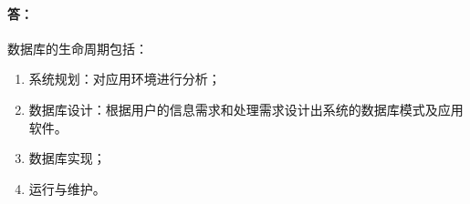 \paragraph{答：}
数据库的生命周期包括：
\begin{enumerate}
	\item 系统规划：对应用环境进行分析；
	\item 数据库设计：根据用户的信息需求和处理需求设计出系统的数据库模式及应用软件。
	\item 数据库实现；
	\item 运行与维护。
\end{enumerate}